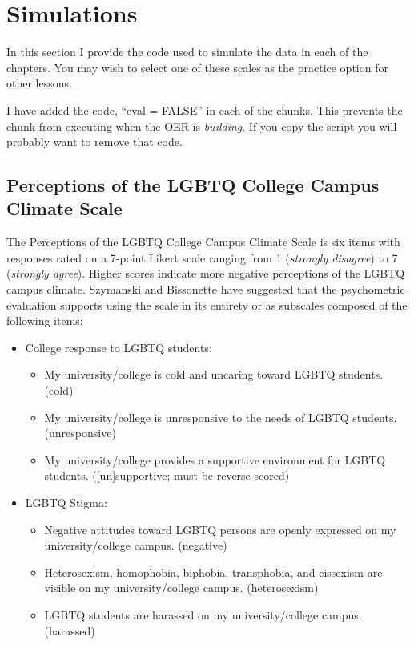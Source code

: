 \documentclass[
  english,
]{book}
\providecommand{\tightlist}{%
  \setlength{\itemsep}{0pt}\setlength{\parskip}{0pt}}
\begin{document}
\hypertarget{sims}{%
\chapter{Simulations}\label{sims}}

In this section I provide the code used to simulate the data in each of the chapters. You may wish to select one of these scales as the practice option for other lessons.

I have added the code, ``eval = FALSE'' in each of the chunks. This prevents the chunk from executing when the OER is \emph{building}. If you copy the script you will probably want to remove that code.

\hypertarget{perceptions-of-the-lgbtq-college-campus-climate-scale}{%
\section{Perceptions of the LGBTQ College Campus Climate Scale}\label{perceptions-of-the-lgbtq-college-campus-climate-scale}}

The Perceptions of the LGBTQ College Campus Climate Scale \citep{szymanski_perceptions_2020} is six items with responses rated on a 7-point Likert scale ranging from 1 (\emph{strongly disagree}) to 7 (\emph{strongly agree}). Higher scores indicate more negative perceptions of the LGBTQ campus climate. Szymanski and Bissonette have suggested that the psychometric evaluation supports using the scale in its entirety or as subscales composed of the following items:

\begin{itemize}
\tightlist
\item
  College response to LGBTQ students:

  \begin{itemize}
  \tightlist
  \item
    My university/college is cold and uncaring toward LGBTQ students. (cold)
  \item
    My university/college is unresponsive to the needs of LGBTQ students. (unresponsive)
  \item
    My university/college provides a supportive environment for LGBTQ students. ({[}un{]}supportive; must be reverse-scored)
  \end{itemize}
\item
  LGBTQ Stigma:

  \begin{itemize}
  \tightlist
  \item
    Negative attitudes toward LGBTQ persons are openly expressed on my university/college campus. (negative)
  \item
    Heterosexism, homophobia, biphobia, transphobia, and cissexism are visible on my university/college campus. (heterosexism)
  \item
    LGBTQ students are harassed on my university/college campus. (harassed)
  \end{itemize}
\end{itemize}
\end{document}
